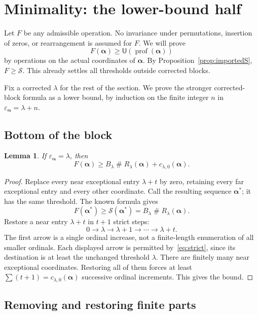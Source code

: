 \documentclass[11pt,a4paper]{article}
\newtheorem{lemma}[theorem]{Lemma}
\theoremstyle{definition}
\newcommand{\ns}{\mathbin{\#}}
\newcommand{\OpS}{\mathcal S}
\newcommand{\FunU}{\mathsf U}
\newcommand{\prof}{\operatorname{prof}}
\newcommand{\seq}[1]{\boldsymbol{#1}}
\newcommand{\epsa}{\varepsilon_{\seq\alpha}}
\begin{document}
\section{Minimality: the lower-bound half}\label{block:sec:lower}

Let $F$ be any admissible operation. No invariance under permutations, insertion of zeros, or rearrangement is assumed for $F$. We will prove
\[
 F(\seq\alpha)\ge\FunU(\prof(\seq\alpha))
\]
by operations on the actual coordinates of $\seq\alpha$. By Proposition~\ref{prop:importedS}, $F\ge\OpS$. This already settles all thresholds outside corrected blocks.

Fix a corrected $\lambda$ for the rest of the section. We prove the stronger corrected-block formula as a lower bound, by induction on the finite integer $n$ in $\epsa=\lambda+n$.

\subsection{Bottom of the block}

\begin{lemma}\label{block:lem:lower-bottom}
If $\epsa=\lambda$, then
\[
 F(\seq\alpha)\ge B_\lambda\ns R_\lambda(\seq\alpha)
                         +c_{\lambda,0}(\seq\alpha).
\]
\end{lemma}
\begin{proof}
Replace every near exceptional entry $\lambda+t$ by zero, retaining every far exceptional entry and every other coordinate. Call the resulting sequence $\seq\alpha^*$; it has the same threshold. The known formula gives
\[
 F(\seq\alpha^*)\ge\OpS(\seq\alpha^*)
           =B_\lambda\ns R_\lambda(\seq\alpha).
\]
Restore a near entry $\lambda+t$ in $t+1$ strict steps:
\[
 0\longrightarrow\lambda\longrightarrow\lambda+1
   \longrightarrow\cdots\longrightarrow\lambda+t.
\]
The first arrow is a single ordinal increase, not a finite-length enumeration of all smaller ordinals. Each displayed arrow is permitted by~\eqref{eq:strict}, since its destination is at least the unchanged threshold $\lambda$. There are finitely many near exceptional coordinates. Restoring all of them forces at least
$\sum(t+1)=c_{\lambda,0}(\seq\alpha)$ successive ordinal increments. This gives the bound.
\end{proof}

\subsection{Removing and restoring finite parts}
\end{document}
